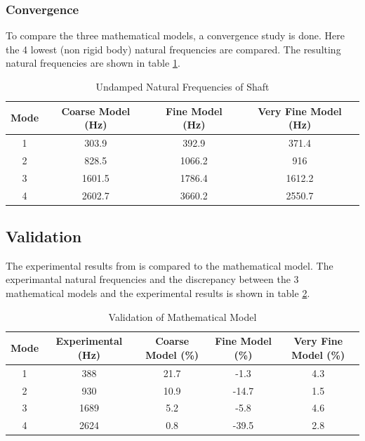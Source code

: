 \subsubsection{Convergence}
To compare the three mathematical models, a convergence study is done. Here the 4 lowest (non rigid body) natural frequencies are compared.
The resulting natural frequencies are shown in table \ref{tab:natural_freq}.
\begin{table}[htbp]
    \centering
    \caption{Undamped Natural Frequencies of Shaft}
    \label{tab:natural_freq}
    \begin{tabular}{@{}cccc@{}}
        \toprule
        Mode    &   Coarse Model (\si{\hertz})    &   Fine Model (\si{\hertz})  &   Very Fine Model (\si{\hertz}) \\ \midrule
        1       &   303.9   &   392.9   &   371.4   \\
        2       &   828.5   &   1066.2  &   916     \\
        3       &   1601.5  &   1786.4  &   1612.2  \\
        4       &   2602.7  &   3660.2  &   2550.7  \\ \bottomrule
    \end{tabular}
\end{table}

\subsection{Validation}
The experimental results from \cite[6]{Problem} is compared to the mathematical model. The experimantal natural frequencies and the discrepancy between the 3 mathematical models and the experimental results is shown in table \ref{tab:validation}.

\begin{table}[htbp]
    \begin{adjustwidth}{-2cm}{-2cm}
    \centering
    \caption{Validation of Mathematical Model}
    \label{tab:validation}
    \begin{tabular}{@{}ccccc@{}}
        \toprule
        Mode    &   Experimental (\si{\hertz})    &   Coarse Model (\si{\percent})    &   Fine Model (\si{\percent})  &   Very Fine Model (\si{\percent}) \\ \midrule
        1       &   388     &   21.7   &   -1.3   &   4.3   \\
        2       &   930     &   10.9   &   -14.7  &   1.5     \\
        3       &   1689    &   5.2  &   -5.8  &   4.6  \\
        4       &   2624    &   0.8  &   -39.5  &   2.8  \\ \bottomrule
    \end{tabular}
    \end{adjustwidth}
\end{table}


